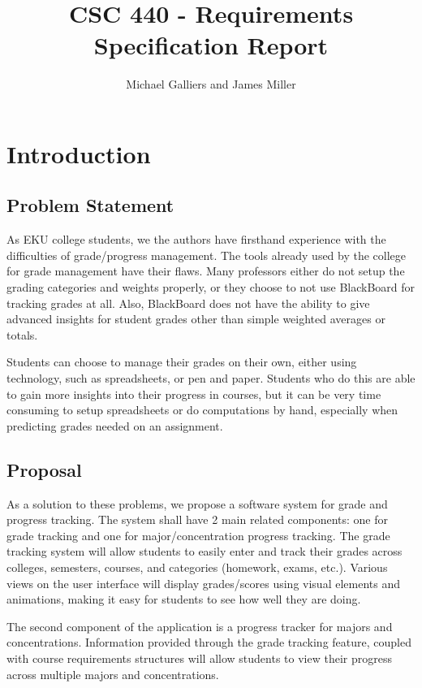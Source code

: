 \documentclass[12pt]{article}
\author{Michael Galliers and James Miller}
\title{CSC 440 - Requirements Specification Report}
\begin{document}
\begin{titlepage}
\maketitle
\end{titlepage}

\newpage
    \tableofcontents
\newpage

\thispagestyle{empty}
\listoffigures
\newpage

\section{Introduction}
\subsection{Problem Statement}
As EKU college students, we the authors have firsthand experience with the difficulties of
grade/progress management. The tools already used by the college for grade management have their
flaws. Many professors either do not setup the grading categories and weights properly, or they
choose to not use BlackBoard for tracking grades at all. Also, BlackBoard does not have the ability
to give advanced insights for student grades other than simple weighted averages or totals.

Students can choose to manage their grades on their own, either using technology, such as
spreadsheets, or pen and paper. Students who do this are able to gain more insights into their
progress in courses, but it can be very time consuming to setup spreadsheets or do computations by
hand, especially when predicting grades needed on an assignment.

\subsection{Proposal}
As a solution to these problems, we propose a software system for grade and progress tracking. The
system shall have 2 main related components: one for grade tracking and one for major/concentration
progress tracking. The grade tracking system will allow students to easily enter and track their
grades across colleges, semesters, courses, and categories (homework, exams, etc.). Various views on
the user interface will display grades/scores using visual elements and animations, making it easy
for students to see how well they are doing.

The second component of the application is a progress tracker for majors and concentrations.
Information provided through the grade tracking feature, coupled with course requirements structures
will allow students to view their progress across multiple majors and concentrations.
\end{document}
